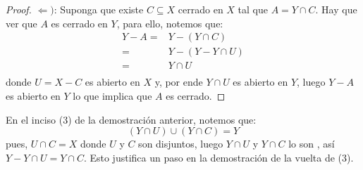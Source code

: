 \documentclass[12pt]{report}
\theoremstyle{largebreak}
\begin{document}
\begin{proof}
        $\Leftarrow)$: Suponga que existe $C\subseteq X$ cerrado en $X$ tal que $A=Y\cap C$. Hay que ver que $A$ es cerrado en $Y$, para ello, notemos que:
        \begin{equation*}
            \begin{split}
                Y-A=&Y-(Y\cap C) \\
                =&Y-(Y-Y\cap U) \\
                =&Y\cap U \\
            \end{split}
        \end{equation*}
        donde $U=X-C$ es abierto en $X$ y, por ende $Y\cap U$ es abierto en $Y$, luego $Y-A$ es abierto en $Y$ lo que implica que $A$ es cerrado.

    \end{proof}

    \begin{obs}
        En el inciso (3) de la demostración anterior, notemos que:
        \begin{equation*}
            (Y\cap U)\cup (Y\cap C)=Y
        \end{equation*}
        pues, $U\cap C = X$ donde $U$ y $C$ son disjuntos, luego $Y\cap U$ y $Y\cap C$ lo son , así $Y-Y\cap U=Y\cap C$. Esto justifica un paso en la demostración de la vuelta de (3).
    \end{obs}
\end{document}
